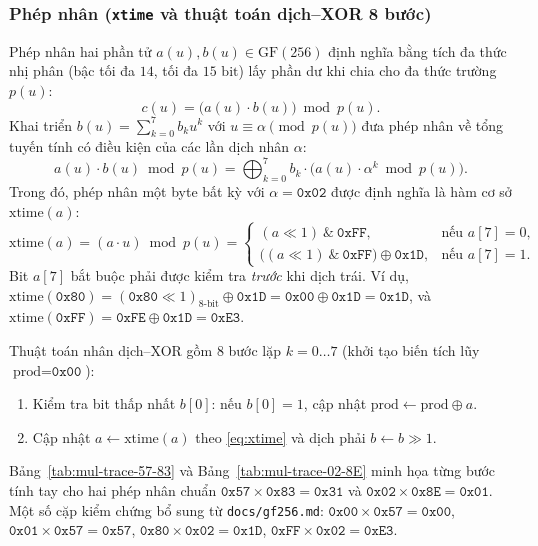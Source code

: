\documentclass[12pt,a4paper]{report}
\begin{document}
\subsubsection{Phép nhân (\texttt{xtime} và thuật toán dịch--XOR 8 bước)}
Phép nhân hai phần tử $a(u), b(u) \in \text{GF}(256)$ định nghĩa bằng tích đa thức nhị phân (bậc tối đa $14$, tối đa $15\text{ bit}$) lấy phần dư khi chia cho đa thức trường $p(u)$:
\begin{equation}
    c(u) = \bigl(a(u) \cdot b(u)\bigr) \bmod p(u).
    \label{eq:gf-mul-def}
\end{equation}
Khai triển $b(u) = \sum_{k=0}^{7} b_k u^k$ với $u \equiv \alpha \pmod{p(u)}$ đưa phép nhân về tổng tuyến tính có điều kiện của các lần dịch nhân $\alpha$:
\begin{equation}
    a(u) \cdot b(u) \bmod p(u) = \bigoplus_{k=0}^{7} b_k \cdot \bigl(a(u) \cdot \alpha^k \bmod p(u)\bigr).
    \label{eq:gf-mul-shift}
\end{equation}
Trong đó, phép nhân một byte bất kỳ với $\alpha = \texttt{0x02}$ được định nghĩa là hàm cơ sở $\text{xtime}(a)$:
\begin{equation}
    \text{xtime}(a) = (a \cdot u) \bmod p(u) =
    \begin{cases}
        (a \ll 1) \ \& \ \texttt{0xFF}, & \text{nếu } a[7] = 0, \\
        \bigl((a \ll 1) \ \& \ \texttt{0xFF}\bigr) \oplus \texttt{0x1D}, & \text{nếu } a[7] = 1.
    \end{cases}
    \label{eq:xtime}
\end{equation}
Bit $a[7]$ bắt buộc phải được kiểm tra \textit{trước} khi dịch trái. Ví dụ, $\text{xtime}(\texttt{0x80}) = (\texttt{0x80} \ll 1)_{\text{8-bit}} \oplus \texttt{0x1D} = \texttt{0x00} \oplus \texttt{0x1D} = \texttt{0x1D}$, và $\text{xtime}(\texttt{0xFF}) = \texttt{0xFE} \oplus \texttt{0x1D} = \texttt{0xE3}$.

Thuật toán nhân dịch--XOR gồm $8$ bước lặp $k = 0 \dots 7$ (khởi tạo biến tích lũy $\text{prod} = \texttt{0x00}$):
\begin{enumerate}
    \item Kiểm tra bit thấp nhất $b[0]$: nếu $b[0] = 1$, cập nhật $\text{prod} \leftarrow \text{prod} \oplus a$.
    \item Cập nhật $a \leftarrow \text{xtime}(a)$ theo \eqref{eq:xtime} và dịch phải $b \leftarrow b \gg 1$.
\end{enumerate}

Bảng~\ref{tab:mul-trace-57-83} và Bảng~\ref{tab:mul-trace-02-8E} minh họa từng bước tính tay cho hai phép nhân chuẩn $\texttt{0x57} \times \texttt{0x83} = \texttt{0x31}$ và $\texttt{0x02} \times \texttt{0x8E} = \texttt{0x01}$. Một số cặp kiểm chứng bổ sung từ \texttt{docs/gf256.md}: $\texttt{0x00} \times \texttt{0x57} = \texttt{0x00}$, $\texttt{0x01} \times \texttt{0x57} = \texttt{0x57}$, $\texttt{0x80} \times \texttt{0x02} = \texttt{0x1D}$, $\texttt{0xFF} \times \texttt{0x02} = \texttt{0xE3}$.
\end{document}
